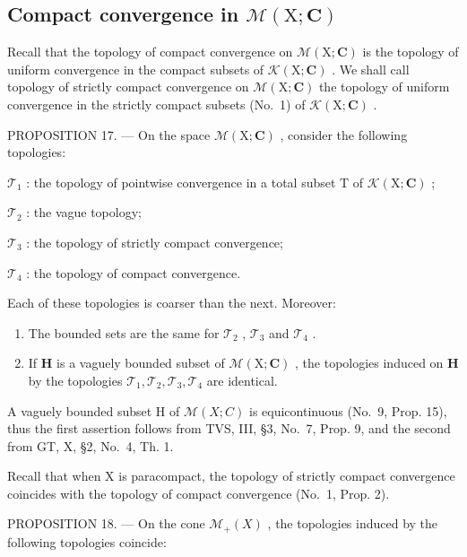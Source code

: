 \subsection{\texorpdfstring{Compact convergence in \(\mathcal{M}(\mathrm{X};\mathbf{C})\)}{Compact convergence in M(X; C)}}

Recall that the topology of compact convergence on \(\mathcal{M}(\mathrm{X};\mathbf{C})\) is the topology of uniform convergence in the compact subsets of \(\mathcal{K}(\mathrm{X};\mathbf{C})\) . We shall call topology of strictly compact convergence on \(\mathcal{M}(\mathrm{X};\mathbf{C})\) the topology of uniform convergence in the strictly compact subsets (No.~1) of \(\mathcal{K}(\mathrm{X};\mathbf{C})\) .

PROPOSITION 17. --- On the space \(\mathcal{M}(\mathrm{X};\mathbf{C})\) , consider the following topologies:

\(\mathcal{T}_1\) : the topology of pointwise convergence in a total subset \(\mathrm{T}\) of \(\mathcal{K}(\mathrm{X};\mathbf{C})\) ;

\(\mathcal{T}_2\) : the vague topology;

\(\mathcal{T}_3\) : the topology of strictly compact convergence;

\(\mathcal{T}_4\) : the topology of compact convergence.

Each of these topologies is coarser than the next. Moreover:

\begin{enumerate}
\def\labelenumi{(\roman{enumi})}
\item
  The bounded sets are the same for \(\mathcal{T}_2\) , \(\mathcal{T}_3\) and \(\mathcal{T}_4\) .
\item
  If \(\mathbf{H}\) is a vaguely bounded subset of \(\mathcal{M}(\mathrm{X};\mathbf{C})\) , the topologies induced on \(\mathbf{H}\) by the topologies \(\mathcal{T}_1, \mathcal{T}_2, \mathcal{T}_3, \mathcal{T}_4\) are identical.
\end{enumerate}

A vaguely bounded subset H of \(\mathcal{M}(X;C)\) is equicontinuous (No.~9, Prop. 15), thus the first assertion follows from TVS, III, §3, No.~7, Prop. 9, and the second from GT, X, §2, No.~4, Th. 1.

Recall that when X is paracompact, the topology of strictly compact convergence coincides with the topology of compact convergence (No.~1, Prop. 2).

PROPOSITION 18. --- On the cone \(\mathcal{M}_{+}(X)\) , the topologies induced by the following topologies coincide:


